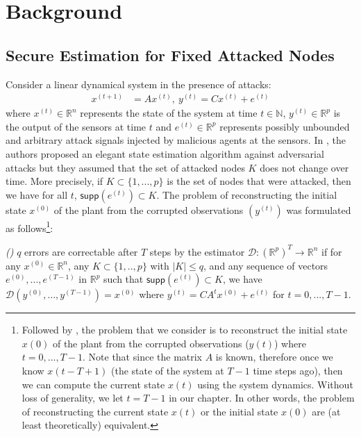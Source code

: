 \documentclass[../../thesis.tex]{subfiles}
\begin{document}

\section{Background}\label{sec:overview} 

\subsection{Secure Estimation for Fixed Attacked Nodes \cite{Fawzi:2014} }

Consider a linear dynamical system in the presence of attacks:
\begin{eqnarray}
		x^{(t+1)} &= A x^{(t)}, ~y^{(t)} = C x ^{(t)} + e^{(t)}
		\label{eq:system_model}
\end{eqnarray}
where $x^{(t)}\in \mathbb{R}^n$ represents the state of the system at time $t\in \mathbb{N}$, $y^{(t)} \in \mathbb{R}^p$ is the output of the sensors at time $t$ and $e^{(t)} \in \mathbb{R}^p $ represents possibly unbounded and arbitrary attack signals injected by malicious agents at the sensors. In \cite{Fawzi:2014}, the authors proposed an elegant state estimation algorithm against adversarial attacks but they assumed that the set of attacked nodes $K$ does not change over time. More precisely, if $K \subset \{1, ..., p\}$ is the set of nodes that were attacked, then we have for all $t$, $\textsf{supp}(e^{(t)})\subset K$. The problem of reconstructing the initial state $x^{(0)}$ of the plant from the corrupted observations $( y^{(t)})$ was formulated as follows\footnote{Followed by \cite{Fawzi:2014}, the problem that we consider is to reconstruct the initial state $x(0)$ of the plant from the corrupted observations ($y(t)$) where $t=0,...,T-1$. Note that since the matrix $A$ is known, therefore once we know $x(t-T+1)$ (the state of the system at $T-1$ time steps ago), then we can compute the current state $x(t)$ using the system dynamics. Without loss of generality, we let $t=T-1$ in our chapter. In other words, the problem of reconstructing the current state $x(t)$ or the initial state $x(0)$ are (at least theoretically) equivalent.}:

\begin{definition} \emph{(\hspace{1sp}\cite{Fawzi:2014})} 
$q$ errors are correctable after $T$ steps by the estimator $\mathcal{D}: {(\mathbb{R} ^p) } ^T  \rightarrow \mathbb{R}^n$ if for any $x^{(0)} \in \mathbb{R}^n$, any $K \subset \{1,.., p\} $ with $\lvert K \rvert \le q$, and any sequence of vectors $e^{(0)},...,e^{(T-1)}$ in $\mathbb{R}^p$ such that $\textsf{supp}(e^{(t)}) \subset K$, we have $\mathcal{D} (y^{(0)},...,y^{(T-1)}) = x^{(0)}$ where $y^{(t)} = CA^t x^{(0)} + e^{(t)}$ for $t=0,...,T-1$.
\end{definition}
\end{document}
